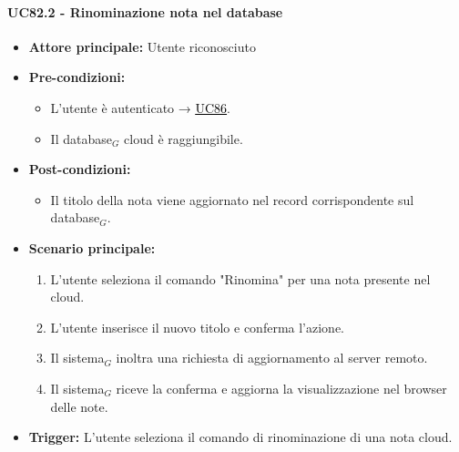 \documentclass[a4paper, 10pt]{article}
\newcommand{\uclink}[2]{\hyperlink{#1}{\textcolor{black}{\underline{#2}}}}
\begin{document}
\paragraph{UC82.2 - Rinominazione nota nel database}
\hypertarget{uc:82.2}{}
\begin{itemize}
    \item \textbf{Attore principale:} Utente riconosciuto
    \item \textbf{Pre-condizioni:} 
        \begin{itemize}
            \item L'utente è autenticato → \uclink{uc:86}{UC86}.
            \item Il database$_G$ cloud è raggiungibile.
        \end{itemize}
    \item \textbf{Post-condizioni:} 
        \begin{itemize}
            \item Il titolo della nota viene aggiornato nel record corrispondente sul database$_G$.
        \end{itemize}
    \item \textbf{Scenario principale:}
        \begin{enumerate}
            \item L'utente seleziona il comando "Rinomina" per una nota presente nel cloud.
            \item L'utente inserisce il nuovo titolo e conferma l'azione.
            \item Il sistema$_G$ inoltra una richiesta di aggiornamento al server remoto.
            \item Il sistema$_G$ riceve la conferma e aggiorna la visualizzazione nel browser delle note.
        \end{enumerate}
    \item \textbf{Trigger:} L'utente seleziona il comando di rinominazione di una nota cloud.
\end{itemize}
\end{document}
